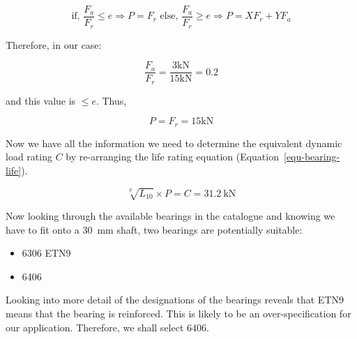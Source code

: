 \begin{equation}
    \text{if, }\frac{F_a}{F_r}\le e \Rightarrow P=F_r \text{ else, } \frac{F_a}{F_r}\ge e \Rightarrow P=XF_r+YF_a
\end{equation}

Therefore, in our case:

\begin{equation}
    \frac{F_a}{F_r}=\frac{3\si{\kilo\newton}}{15\si{\kilo\newton}}=0.2
\end{equation}

\noindent{} and this value is \(\le e\). Thus, 

\begin{equation}
    P=F_r=15\si{\kilo\newton}
\end{equation}

Now we have all the information we need to determine the equivalent dynamic load rating \(C\) by re-arranging the life rating equation (Equation~\ref{equ-bearing-life}). 

\begin{equation}
    \sqrt[p]{L_{10}}\times P = C = \SI{31.2}{\kilo\newton}
\end{equation}

Now looking through the available bearings in the catalogue and knowing we have to fit onto a \SI{30}{\milli\metre} shaft, two bearings are potentially suitable:

\begin{itemize}
    \item 6306 ETN9
    \item 6406
\end{itemize}

Looking into more detail of the designations of the bearings reveals that ETN9 means that the bearing is reinforced. This is likely to be an over-specification for our application. Therefore, we shall select 6406.



